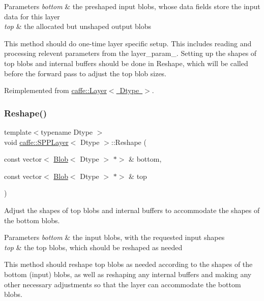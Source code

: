\begin{DoxyParams}{Parameters}
{\em bottom} & the preshaped input blobs, whose data fields store the input data for this layer \\
\hline
{\em top} & the allocated but unshaped output blobs\\
\hline
\end{DoxyParams}
This method should do one-\/time layer specific setup. This includes reading and processing relevent parameters from the {\ttfamily layer\+\_\+param\+\_\+}. Setting up the shapes of top blobs and internal buffers should be done in {\ttfamily Reshape}, which will be called before the forward pass to adjust the top blob sizes. 

Reimplemented from \mbox{\hyperlink{classcaffe_1_1_layer_a481323a3e0972c682787f2137468c29f}{caffe\+::\+Layer$<$ Dtype $>$}}.

\mbox{\label{classcaffe_1_1_s_p_p_layer_a3ba65e459c1bde4f772d545efb43a2f2}} 
\subsubsection{\texorpdfstring{Reshape()}{Reshape()}\hspace{0.1cm}{\footnotesize\ttfamily [1/2]}}
{\footnotesize\ttfamily template$<$typename Dtype $>$ \\
void \mbox{\hyperlink{classcaffe_1_1_s_p_p_layer}{caffe\+::\+S\+P\+P\+Layer}}$<$ Dtype $>$\+::Reshape (\begin{DoxyParamCaption}\item[{const vector$<$ \mbox{\hyperlink{classcaffe_1_1_blob}{Blob}}$<$ Dtype $>$ $\ast$$>$ \&}]{bottom,  }\item[{const vector$<$ \mbox{\hyperlink{classcaffe_1_1_blob}{Blob}}$<$ Dtype $>$ $\ast$$>$ \&}]{top }\end{DoxyParamCaption})\hspace{0.3cm}{\ttfamily [virtual]}}



Adjust the shapes of top blobs and internal buffers to accommodate the shapes of the bottom blobs. 


\begin{DoxyParams}{Parameters}
{\em bottom} & the input blobs, with the requested input shapes \\
\hline
{\em top} & the top blobs, which should be reshaped as needed\\
\hline
\end{DoxyParams}
This method should reshape top blobs as needed according to the shapes of the bottom (input) blobs, as well as reshaping any internal buffers and making any other necessary adjustments so that the layer can accommodate the bottom blobs. 

